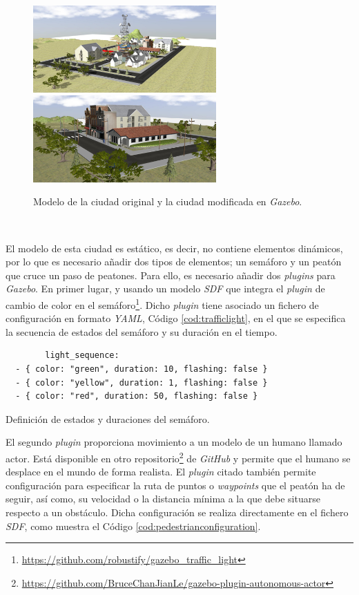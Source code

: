 \begin{figure} [h!]
	\begin{center}
		\includegraphics[width=7cm]{figs/city2}\hspace{1cm}\includegraphics[width=7cm]{figs/smallcity}
	\end{center}
	\caption{Modelo de la ciudad original y la ciudad modificada en \textit{Gazebo}.}
	\label{fig:cityversus}
\end{figure}\

El modelo de esta ciudad es estático, es decir, no contiene elementos dinámicos, por lo que es necesario añadir dos tipos de elementos; un semáforo y un peatón que cruce un paso
de peatones. Para ello, es necesario añadir dos \textit{plugins} para \textit{Gazebo}. En primer lugar, y usando un modelo \textit{SDF} que integra el \textit{plugin} de cambio de
color en el semáforo\footnote{\url{https://github.com/robustify/gazebo_traffic_light}}. Dicho \textit{plugin} tiene asociado un fichero de configuración en formato \textit{YAML},
Código \ref{cod:trafficlight}, en el que se especifica la secuencia de estados del semáforo y su duración en el tiempo.\\

\begin{code}[h]
	\begin{lstlisting}
		light_sequence:
  - { color: "green", duration: 10, flashing: false }
  - { color: "yellow", duration: 1, flashing: false }
  - { color: "red", duration: 50, flashing: false }
	\end{lstlisting}
	\caption[Definición de estados y duraciones del semáforo.]{Definición de estados y duraciones del semáforo.}
	\label{cod:trafficlight}
\end{code}

El segundo \textit{plugin} proporciona movimiento a un modelo de un humano llamado actor. Está disponible en otro
repositorio\footnote{\url{https://github.com/BruceChanJianLe/gazebo-plugin-autonomous-actor}} de \textit{GitHub} y permite que el humano se desplace en el mundo de forma
realista. El \textit{plugin} citado también permite configuración para especificar la ruta de puntos o \textit{waypoints} que el peatón ha de seguir, así como, su velocidad o la
distancia mínima a la que debe situarse respecto a un obstáculo. Dicha configuración se realiza directamente en el fichero \textit{SDF}, como muestra el Código
\ref{cod:pedestrianconfiguration}.\\

